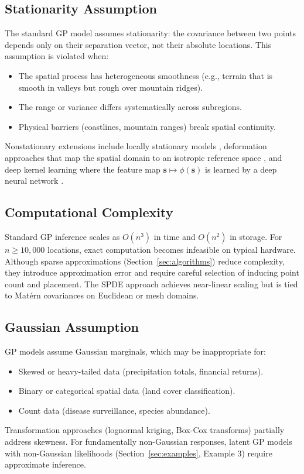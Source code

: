 \documentclass[conference]{IEEEtran}
\begin{document}
\subsection{Stationarity Assumption}

The standard GP model assumes stationarity: the covariance between two points depends only on their separation vector, not their absolute locations. This assumption is violated when:
\begin{itemize}
  \item The spatial process has heterogeneous smoothness (e.g., terrain that is smooth in valleys but rough over mountain ridges).
  \item The range or variance differs systematically across subregions.
  \item Physical barriers (coastlines, mountain ranges) break spatial continuity.
\end{itemize}
Nonstationary extensions include locally stationary models \cite{fuentes2001new}, deformation approaches that map the spatial domain to an isotropic reference space \cite{sampson1992nonparametric}, and deep kernel learning where the feature map $\mathbf{s} \mapsto \phi(\mathbf{s})$ is learned by a deep neural network \cite{wilson2016deep}.

\subsection{Computational Complexity}

Standard GP inference scales as $O(n^3)$ in time and $O(n^2)$ in storage. For $n \geq 10{,}000$ locations, exact computation becomes infeasible on typical hardware. Although sparse approximations (Section~\ref{sec:algorithms}) reduce complexity, they introduce approximation error and require careful selection of inducing point count and placement. The SPDE approach achieves near-linear scaling but is tied to Mat\'{e}rn covariances on Euclidean or mesh domains.

\subsection{Gaussian Assumption}

GP models assume Gaussian marginals, which may be inappropriate for:
\begin{itemize}
  \item Skewed or heavy-tailed data (precipitation totals, financial returns).
  \item Binary or categorical spatial data (land cover classification).
  \item Count data (disease surveillance, species abundance).
\end{itemize}
Transformation approaches (lognormal kriging, Box-Cox transforms) partially address skewness. For fundamentally non-Gaussian responses, latent GP models with non-Gaussian likelihoods (Section~\ref{sec:examples}, Example 3) require approximate inference.
\end{document}
